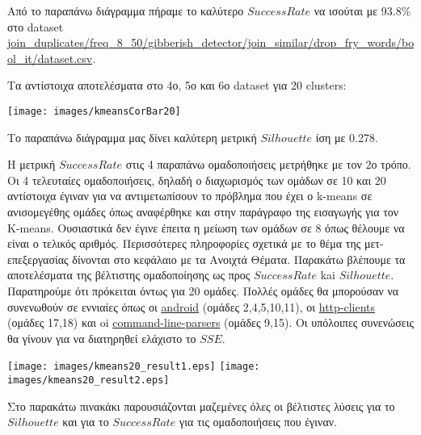 Από το παραπάνω διάγραμμα πήραμε το καλύτερο $Success Rate$ να ισούται με 93.8\% στο dataset \url{join_duplicates/freq_8_50/gibberish_detector/join_similar/drop_fry_words/bool_it/dataset.csv}.

Τα αντίστοιχα αποτελέσματα στο 4ο, 5ο και 6ο dataset για 20 clusters:\\
\noindent\begin{minipage}{\linewidth}
    \centering
    \texttt{[image: images/kmeansCorBar20]}
    \label{fig:kmeansCorBar20}
\end{minipage}

Το παραπάνω διάγραμμα μας δίνει καλύτερη μετρική $Silhouette$ ίση με 0.278.

Η μετρική $Success Rate$ στις 4 παραπάνω ομαδοποιήσεις μετρήθηκε με τον 2ο τρόπο.
Οι 4 τελευταίες ομαδοποιήσεις, δηλαδή ο διαχωρισμός των ομάδων σε 10 και 20 αντίστοιχα έγιναν για να αντιμετωπίσουν το πρόβλημα που έχει ο k-means σε ανισομεγέθης ομάδες όπως αναφέρθηκε και στην παράγραφο της εισαγωγής για τον K-means. Ουσιαστικά δεν έγινε έπειτα η μείωση των ομάδων σε 8 όπως θέλουμε να είναι ο τελικός αριθμός. Περισσότερες πληροφορίες σχετικά με το θέμα της μετ-επεξεργασίας δίνονται στο κεφάλαιο με τα Ανοιχτά Θέματα.
Παρακάτω βλέπουμε τα αποτελέσματα της βέλτιστης ομαδοποίησης ως προς $Success Rate$ kai $Silhouette$. Παρατηρούμε ότι πρόκειται όντως για 20 ομάδες. Πολλές ομάδες θα μπορούσαν να συνενωθούν σε εννιαίες όπως οι \url{android} (ομάδες 2,4,5,10,11), οι \url{http-clients} (ομάδες 17,18) και oi \url{command-line-parsers} (ομάδες 9,15). Οι υπόλοιπες συνενώσεις θα γίνουν για να διατηρηθεί ελάχιστο το $SSE$.
\\\noindent\begin{minipage}{\linewidth}
    \centering
    \texttt{[image: images/kmeans20\_result1.eps]}
    \texttt{[image: images/kmeans20\_result2.eps]}
    \label{fig:kmeans20_result}
\end{minipage}
Στο παρακάτω πινακάκι παρουσιάζονται μαζεμένες όλες οι βέλτιστες λύσεις για το $Silhouette$ και για το $Success Rate$ για τις ομαδοποιήσεις που έγιναν.

